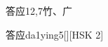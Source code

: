 \begin{entry}{答应}{12,7}{⽵、⼴}
  \begin{phonetics}{答应}{da1ying5}[][HSK 2]
  \end{phonetics}
\end{entry}
